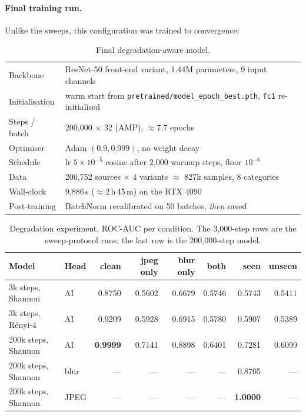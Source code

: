 \paragraph{Final training run.} Unlike the sweeps, this configuration was
trained to convergence:

\begin{table}[h]
  \centering
  \caption{Final degradation-aware model.}
  \label{tab:final-training}
  \begin{tabular}{ll}
    \toprule
    Backbone        & ResNet-50 front-end variant, 1.44M parameters, 9 input channels \\
    Initialisation  & warm start from \texttt{pretrained/model\_epoch\_best.pth}, \texttt{fc1} re-initialised \\
    Steps / batch   & 200{,}000 $\times$ 32 (AMP), $\approx$7.7 epochs \\
    Optimiser       & Adam $(0.9, 0.999)$, no weight decay \\
    Schedule        & lr $5\times10^{-5}$ cosine after 2{,}000 warmup steps, floor $10^{-6}$ \\
    Data            & 206{,}752 sources $\times$ 4 variants $\approx$ 827k samples, 8 categories \\
    Wall-clock      & 9{,}886\,s ($\approx$2\,h\,45\,m) on the RTX 4090 \\
    Post-training   & BatchNorm recalibrated on 50 batches, \emph{then} saved \\
    \bottomrule
  \end{tabular}
\end{table}

\begin{table}[t]
  \centering
  \caption{Degradation experiment, ROC-AUC per condition. The 3{,}000-step rows
  are the sweep-protocol runs; the last row is the 200{,}000-step model.}
  \label{tab:degradation}
  \begin{tabular}{llrrrrrr}
    \toprule
    Model & Head & clean & jpeg only & blur only & both & seen & unseen \\
    \midrule
    3k steps, Shannon    & AI   & 0.8750 & 0.5602 & 0.6679 & 0.5746 & 0.5743 & 0.5411 \\
    3k steps, Rényi-4    & AI   & 0.9209 & 0.5928 & 0.6915 & 0.5780 & 0.5907 & 0.5389 \\
    200k steps, Shannon  & AI   & \textbf{0.9999} & 0.7141 & 0.8898 & 0.6401 & 0.7281 & 0.6099 \\
    200k steps, Shannon  & blur & --- & --- & --- & --- & 0.8705 & --- \\
    200k steps, Shannon  & JPEG & --- & --- & --- & --- & \textbf{1.0000} & --- \\
    \bottomrule
  \end{tabular}
\end{table}


